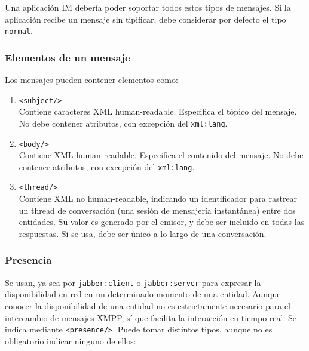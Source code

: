 \documentclass[a4paper, 11pt]{article} %
\begin{document}
      Una aplicación IM debería poder soportar todos estos tipos de mensajes. Si la aplicación recibe un mensaje sin tipificar,
      debe considerar por defecto el tipo \texttt{normal}.
    
    \subsubsection{Elementos de un mensaje}
      Los mensajes pueden contener elementos como:
      \begin{enumerate}
	\item \texttt{<subject/>}\\
	Contiene caracteres XML human-readable. Especifica el tópico del mensaje. No debe contener atributos, con excepción
	del \texttt{xml:lang}.
	
	\item \texttt{<body/>}\\
	Contiene XML human-readable. Especifica el contenido del mensaje. No debe contener atributos, con excepción
	del \texttt{xml:lang}.
	
	\item \texttt{<thread/>}\\
	Contiene XML no human-readable, indicando un identificador para rastrear un thread de conversación (una sesión de
	mensajería instantánea) entre dos entidades. Su valor es generado por el emisor, y debe ser incluido en todas 
	las respuestas. Si se usa, debe ser único a lo largo de una conversación.
      \end{enumerate}

    \subsubsection{Presencia}
      Se usan, ya sea por \texttt{jabber:client} o \texttt{jabber:server} para expresar la disponibilidad en red en un
      determinado momento de una entidad. Aunque conocer la disponibilidad de una entidad no es estrictamente
      necesario para el intercambio de mensajes XMPP, sí que facilita la interacción en tiempo real. Se indica 
      mediante \texttt{<presence/>}. Puede tomar distintos tipos, aunque no es obligatorio indicar ninguno de ellos:
      
\end{document}

